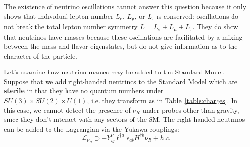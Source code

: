 \documentclass[11pt, oneside]{article}   	%
\theoremstyle{definition}
\numberwithin{equation}{subsection}		%
\begin{document}
The existence of neutrino oscillations cannot answer this question because it only shows that individual lepton number $L_e$, $L_\mu$, or $L_\tau$ is conserved: 
oscillations do not break the total lepton number symmetry $L = L_e + L_\mu + L_\tau$. They do show that neutrinos have masses because these oscillations 
are facilitated by a mixing between the mass and flavor eigenstates, but do not give information as to the character of the particle. 



Let's examine how neutrino masses may be added to the Standard Model. 
Suppose that we add right-handed neutrinos to the Standard Model which are \textbf{sterile} 
in that they have no quantum numbers under $SU(3)\times SU(2)\times U(1)$, i.e. they transform as in Table~\ref{table:charges}. 
In this case, we cannot detect the presence of $\nu_R$ under probes other than gravity, since they don't interact with any sectors of the 
SM. The right-handed neutrinos can be added to the Lagrangian via the Yukawa couplings:
\begin{equation}
	\mathcal L_{\nu_R}\supset -Y_{ij}^\nu \ell^{\dagger a} \epsilon_{ab} H^{\dagger b} \nu_R + h.c.
\end{equation}
\end{document}
